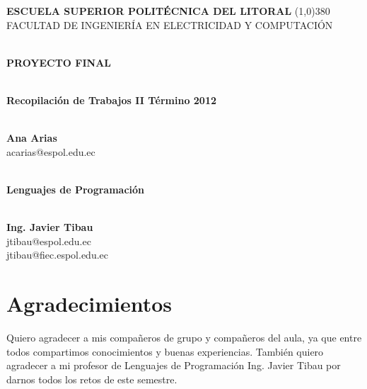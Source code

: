 \documentclass[12pt]{report}
\begin{document}
	\setlength{\topmargin}{-0.5in}
	\pagestyle{empty}
	\begin{center}
		\textbf{
			\vspace{-0.7em}
			ESCUELA SUPERIOR POLITÉCNICA DEL LITORAL
		}
		\line(1,0){380}\\		
		\scriptsize{FACULTAD DE INGENIERÍA EN ELECTRICIDAD Y COMPUTACIÓN}
	\end{center}

	\begin{center}
		\vspace{2.5em}
		\Huge{\textbf{\\PROYECTO FINAL}}
	\end{center}	

	\begin{center}
		\Huge{\textbf{\\Recopilación de Trabajos II Término 2012	\vspace{1em}}}
	\end{center}
	\begin{center}
		\Huge{\textbf{\\Ana Arias	\vspace{1em}}}
		\\ acarias@espol.edu.ec
	\end{center}
	\begin{center}
		\Huge{\textbf{\\Lenguajes de Programación\vspace{1em}}}
	\end{center}	
	\begin{center}
		\Huge{\textbf{\\Ing. Javier Tibau	\vspace{1em}}}
		\\ jtibau@espol.edu.ec
		\\ jtibau@fiec.espol.edu.ec
	\end{center}	



\chapter*{Agradecimientos}
 
Quiero agradecer a mis compañeros de grupo y compañeros del aula, ya que entre todos compartimos conocimientos y buenas experiencias.
También quiero agradecer a mi profesor de Lenguajes de Programación Ing. Javier Tibau por darnos todos los retos de este semestre.
\end{document}

